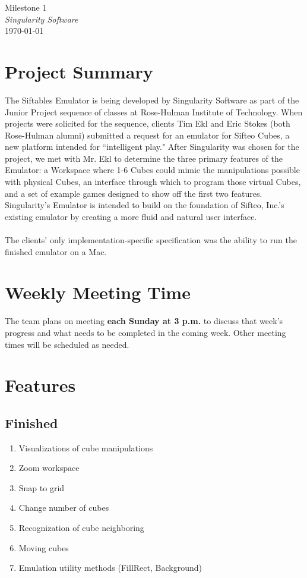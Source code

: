 \documentclass[12pt]{article}
\begin{document}
\begin{center}
	\LARGE{Milestone 1} \\
	\Large{\textit{Singularity Software}} \\
	\vspace{.05in}
	\normalsize{\today} \\
\end{center}

\section*{Project Summary}
The Siftables Emulator is being developed by Singularity Software as part of the Junior Project sequence of classes at Rose-Hulman Institute of Technology. When projects were solicited for the sequence, clients Tim Ekl and Eric Stokes (both Rose-Hulman alumni) submitted a request for an emulator for Sifteo Cubes, a new platform intended for ``intelligent play." After Singularity was chosen for the project, we met with Mr. Ekl to determine the three primary features of the Emulator: a Workspace where 1-6 Cubes could mimic the manipulations possible with physical Cubes, an interface through which to program those virtual Cubes, and a set of example games designed to show off the first two features. Singularity's Emulator is intended to build on the foundation of Sifteo, Inc.'s existing emulator by creating a more fluid and natural user interface.
 \\\\
The clients' only implementation-specific specification was the ability to run the finished emulator on a Mac.

\section*{Weekly Meeting Time}
The team plans on meeting \textbf{each Sunday at 3 p.m.} to discuss that week's progress and what needs to be completed in the coming week. Other meeting times will be scheduled as needed.

\section*{Features}
\subsection*{Finished}

\begin{enumerate}
	\item{Visualizations of cube manipulations}
	\item{Zoom workspace}
	\item{Snap to grid}
	\item{Change number of cubes}
	\item{Recognization of cube neighboring}
	\item{Moving cubes}
	\item{Emulation utility methods (FillRect, Background)}
\end{enumerate}
\end{document}
